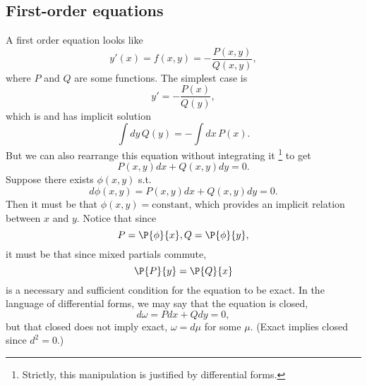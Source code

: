 \subsection*{First-order equations}
A first order equation looks like
\begin{equation}
    y'(x) = f(x,y) = -\frac{P(x,y)}{Q(x,y)},
\end{equation}
where $P$ and $Q$ are some functions. The simplest case is
\begin{equation}
    y' = -\frac{P(x)}{Q(y)},
\end{equation}
which is  and has implicit solution
\begin{equation}
    \int dy\, Q(y) = -\int dx \, P(x).
\end{equation}
But we can also rearrange this equation without integrating it%
    \footnote{Strictly, this manipulation is justified by differential forms.}
to get
\begin{equation}
    P(x,y) dx + Q(x,y) dy=0.
\end{equation}
Suppose there exists $\phi(x,y)$ s.t.
\begin{equation}
    d\phi(x,y) = P(x,y) dx + Q(x,y)dy =0.
\end{equation}
Then it must be that $\phi(x,y)=\text{constant}$, which provides an implicit relation between $x$ and $y$. Notice that since
\begin{equation}
    P=\P{\phi}{x}, Q = \P{\phi}{y},
\end{equation}
it must be that since mixed partials commute,
\begin{equation}
    \P{P}{y} = \P{Q}{x}
\end{equation}
is a necessary and sufficient condition for the equation to be exact. In the language of differential forms, we may say that the equation is closed,
\begin{equation}
    d\omega = P dx + Qdy=0,
\end{equation}
but that closed does not imply exact, $\omega = d\mu$ for some $\mu$. (Exact implies closed since $d^2=0$.)

